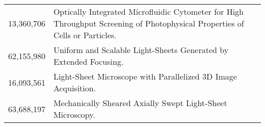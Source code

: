 \begin{tabular}{@{}p{2.5cm}L{12cm}@{}}
    {13,360,706} & Optically Integrated Microfluidic Cytometer for High Throughput Screening of Photophysical Properties of Cells or Particles. \\
    {62,155,980} & Uniform and Scalable Light-Sheets Generated by Extended Focusing.  \\
    {16,093,561} & Light-Sheet Microscope with Parallelized 3D Image Acquisition. \\
    {63,688,197} & Mechanically Sheared Axially Swept Light-Sheet Microscopy. \\
    
\end{tabular} 
\\
%
